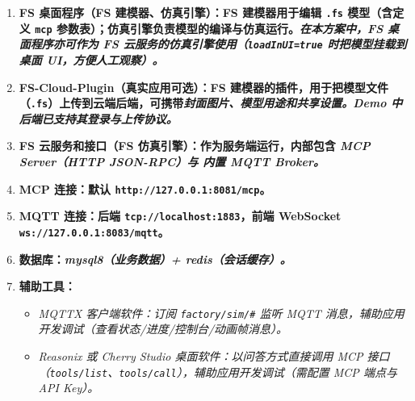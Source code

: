 \begin{enumerate}[label=\arabic*)]
	\item \bf{FS 桌面程序（FS 建模器、仿真引擎）}：FS 建模器用于编辑 \texttt{.fs} 模型（含定义 \texttt{mcp} 参数表）；仿真引擎负责模型的编译与仿真运行。\it{在本方案中，FS 桌面程序亦可作为 FS 云服务的仿真引擎使用}（\texttt{loadInUI=true} 时把模型挂载到桌面 UI，方便人工观察）。
	\item \bf{FS-Cloud-Plugin（真实应用可选）}：FS 建模器的插件，用于把模型文件（\texttt{.fs}）上传到云端后端，可携带\it{封面图片、模型用途和共享设置}。Demo 中后端已支持其登录与上传协议。
	\item \bf{FS 云服务和接口（FS 仿真引擎）}：作为服务端运行，内部包含 \it{MCP Server}（HTTP JSON-RPC）与 \it{内置 MQTT Broker}。
	\item \bf{MCP 连接}：默认 \texttt{http://127.0.0.1:8081/mcp}。
	\item \bf{MQTT 连接}：后端 \texttt{tcp://localhost:1883}，前端 WebSocket \texttt{ws://127.0.0.1:8083/mqtt}。
	\item \bf{数据库}：\it{mysql8}（业务数据）+ \it{redis}（会话缓存）。
	\item \bf{辅助工具}：
	\begin{itemize}
		\item \it{MQTTX 客户端软件}：订阅 \texttt{factory/sim/\#} 监听 MQTT 消息，辅助应用开发调试（查看状态/进度/控制台/动画帧消息）。
		\item \it{Reasonix 或 Cherry Studio 桌面软件}：以问答方式直接调用 MCP 接口（\texttt{tools/list}、\texttt{tools/call}），辅助应用开发调试（需配置 MCP 端点与 API Key）。
	\end{itemize}
\end{enumerate}

